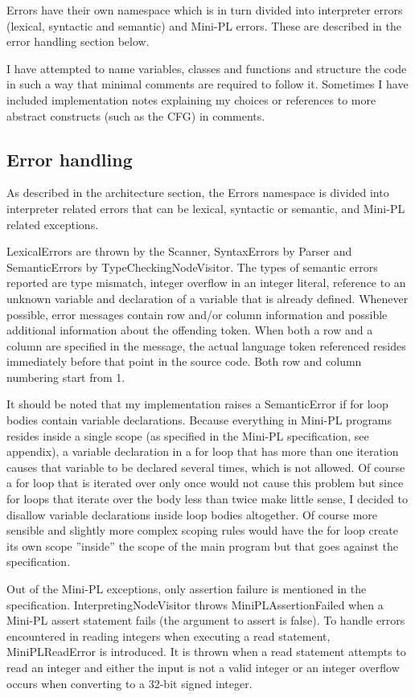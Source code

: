 \documentclass[a4paper,11pt]{article}
\begin{document}
Errors have their own namespace which is in turn divided into interpreter errors (lexical, syntactic and semantic) and Mini-PL errors. These are described in the error handling section below.

I have attempted to name variables, classes and functions and structure the code in such a way that minimal comments are required to follow it. Sometimes I have included implementation notes explaining my choices or references to more abstract constructs (such as the CFG) in comments.

\subsection{Error handling}

As described in the architecture section, the Errors namespace is divided into interpreter related errors that can be lexical, syntactic or semantic, and Mini-PL related exceptions.

LexicalErrors are thrown by the Scanner, SyntaxErrors by Parser and SemanticErrors by TypeCheckingNodeVisitor. The types of semantic errors reported are type mismatch, integer overflow in an integer literal, reference to an unknown variable and declaration of a variable that is already defined. Whenever possible, error messages contain row and/or column information and possible additional information about the offending token. When both a row and a column are specified in the message, the actual language token referenced resides immediately before that point in the source code. Both row and column numbering start from 1.

It should be noted that my implementation raises a SemanticError if for loop bodies contain variable declarations. Because everything in Mini-PL programs resides inside a single scope (as specified in the Mini-PL specification, see appendix), a variable declaration in a for loop that has more than one iteration causes that variable to be declared several times, which is not allowed. Of course a for loop that is iterated over only once would not cause this problem but since for loops that iterate over the body less than twice make little sense, I decided to disallow variable declarations inside loop bodies altogether. Of course more sensible and slightly more complex scoping rules would have the for loop create its own scope ''inside'' the scope of the main program but that goes against the specification.

Out of the Mini-PL exceptions, only assertion failure is mentioned in the specification. InterpretingNodeVisitor throws MiniPLAssertionFailed when a Mini-PL assert statement fails (the argument to assert is false). To handle errors encountered in reading integers when executing a read statement, MiniPLReadError is introduced. It is thrown when a read statement attempts to read an integer and either the input is not a valid integer or an integer overflow occurs when converting to a 32-bit signed integer.
\end{document}

